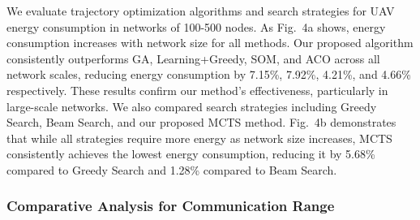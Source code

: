 \documentclass[sigconf]{acmart}
\begin{document}


We evaluate trajectory optimization algorithms and search strategies for UAV energy consumption in networks of 100-500 nodes. As Fig.~4a shows, energy consumption increases with network size for all methods. Our proposed algorithm consistently outperforms GA, Learning+Greedy, SOM, and ACO across all network scales, reducing energy consumption by 7.15\%, 7.92\%, 4.21\%, and 4.66\% respectively. These results confirm our method's effectiveness, particularly in large-scale networks. We also compared search strategies including Greedy Search, Beam Search, and our proposed MCTS method. Fig.~4b demonstrates that while all strategies require more energy as network size increases, MCTS consistently achieves the lowest energy consumption, reducing it by 5.68\% compared to Greedy Search and 1.28\% compared to Beam Search. %



\subsubsection{Comparative Analysis for Communication Range}
\end{document}

